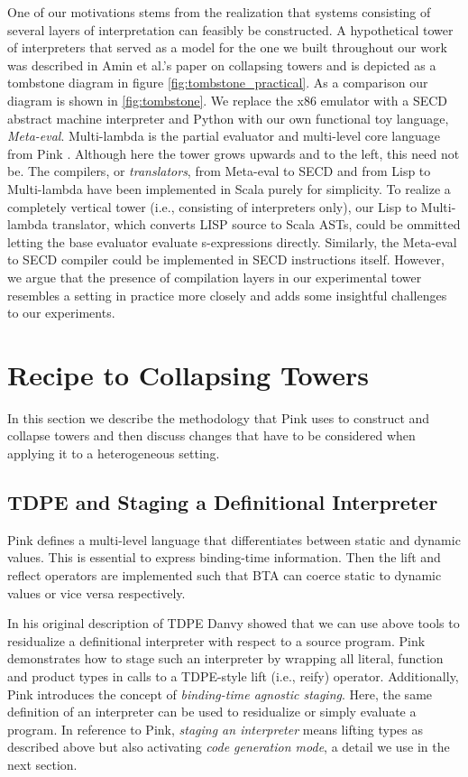 \documentclass[a4paper,12pt,twoside,openright]{report}
\theoremstyle{definition}
\begin{document}
One of our motivations stems from the realization that systems consisting of several layers of interpretation can feasibly be constructed. A hypothetical tower of interpreters that served as a model for the one we built throughout our work was described in Amin et al.'s paper on collapsing towers \cite{amin2017collapsing} and is depicted as a tombstone diagram in figure \ref{fig:tombstone_practical}. As a comparison our diagram is shown in \ref{fig:tombstone}. We replace the x86 emulator with a SECD abstract machine interpreter and Python with our own functional toy language, \textit{Meta-eval}. Multi-lambda is the partial evaluator and multi-level core language from Pink \cite{amin2017collapsing}. Although here the tower grows upwards and to the left, this need not be. The compilers, or \textit{translators}, from Meta-eval to SECD and from Lisp to Multi-lambda have been implemented in Scala purely for simplicity. To realize a completely vertical tower (i.e., consisting of interpreters only), our Lisp to Multi-lambda translator, which converts LISP source to Scala ASTs, could be ommitted letting the base evaluator evaluate s-expressions directly. Similarly, the Meta-eval to SECD compiler could be implemented in SECD instructions itself. However, we argue that the presence of compilation layers in our experimental tower resembles a setting in practice more closely and adds some insightful challenges to our experiments.

\section{Recipe to Collapsing Towers}\label{sec:recipe}
In this section we describe the methodology that Pink uses to construct and collapse towers and then discuss changes that have to be considered when applying it to a heterogeneous setting.

\subsection{TDPE and Staging a Definitional Interpreter}\label{subsec:stage_def_interp}
Pink defines a multi-level language that differentiates between static and dynamic values. This is essential to express binding-time information. Then the lift and reflect operators are implemented such that BTA can coerce static to dynamic values or vice versa respectively.

In his original description of TDPE  Danvy \cite{danvy1999type} showed that we can use above tools to residualize a definitional interpreter with respect to a source program. Pink demonstrates how to stage such an interpreter by wrapping all literal, function and product types in calls to a TDPE-style lift (i.e., reify) operator. Additionally, Pink introduces the concept of \textit{binding-time agnostic staging}. Here, the same definition of an interpreter can be used to residualize or simply evaluate a program. In reference to Pink, \textit{staging an interpreter} means lifting types as described above but also activating \textit{code generation mode}, a detail we use in the next section.
\end{document}
